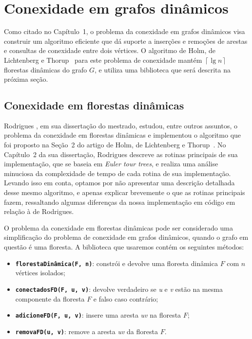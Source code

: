 

\chapter{Conexidade em grafos dinâmicos}

\enlargethispage{.8\baselineskip}

Como citado no Capítulo~1, o problema da conexidade em grafos dinâmicos visa construir um algoritmo eficiente que dá suporte a inserções e remoções de arestas e consultas de conexidade entre dois vértices. O algoritmo de Holm, de Lichtenberg e Thorup~\cite{jacob_holm} para este problema de conexidade mantém $\left\lceil \lg n \right\rceil$ florestas dinâmicas do grafo $G$, e utiliza uma biblioteca que será descrita na próxima seção. 

\section{Conexidade em florestas dinâmicas}
\label{sec:dynamic-forest-connectivity}

Rodrigues \cite{arthur}, em sua dissertação do mestrado, estudou, entre outros assuntos, o problema da conexidade em florestas dinâmicas e implementou o algoritmo que foi proposto na Seção~2 do artigo de Holm, de Lichtenberg e Thorup~\cite{jacob_holm}. No Capítulo~2 da sua dissertação, Rodrigues descreve as rotinas principais de sua implementação, que se baseia em \textit{Euler tour trees}, e realiza uma análise minuciosa da complexidade de tempo de cada rotina de sua implementação. Levando isso em conta, optamos por não apresentar uma descrição detalhada desse mesmo algoritmo, e apenas explicar brevemente o que as rotinas principais fazem, ressaltando algumas diferenças da nossa implementação em código em relação à de Rodrigues.  

O problema da conexidade em florestas dinâmicas pode ser considerado uma simplificação do problema de conexidade em grafos dinâmicos, quando o grafo em questão é uma floresta. A biblioteca que usaremos contém os seguintes métodos:

\begin{itemize}
    \item \texttt{\textbf{florestaDinâmica(F, n)}}: constrói e devolve uma floresta dinâmica $F$ com $n$ vértices isolados;
    \item \texttt{\textbf{conectadosFD(F, u, v)}}: devolve verdadeiro se \textit{u} e \textit{v} estão na mesma componente da floresta $F$ e falso caso contrário;
    \item \texttt{\textbf{adicioneFD(F, u, v)}}: insere uma aresta \textit{uv} na floresta $F$;
    \item \texttt{\textbf{removaFD(u, v)}}: remove a aresta \textit{uv} da floresta $F$.
\end{itemize}


